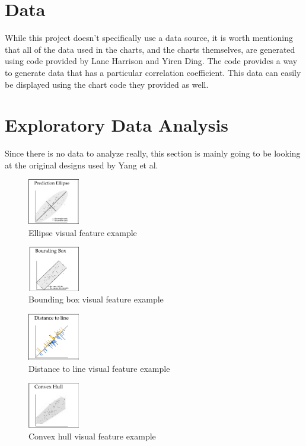 \documentclass{proc}
\begin{document}
	\section{Data} 
		While this project doesn't specifically use a data source, it is worth mentioning that all of the data used in the charts, and the charts themselves, are generated using code provided by Lane Harrison and Yiren Ding. The code provides a way to generate data that has a particular correlation coefficient. This data can easily be displayed using the chart code they provided as well.
	\section{Exploratory Data Analysis}
		Since there is no data to analyze really, this section is mainly going to be looking at the original designs used by Yang et al. 
		\begin{figure}[t]
			\centering
			\includegraphics[width=0.2\textwidth]{ellipse}
			\caption{Ellipse visual feature example \cite{Yang2019}}
			\label{fig:ellipse}
		\end{figure}
		\begin{figure}[t]
			\centering
			\includegraphics[width=0.2\textwidth]{bounding}
			\caption{Bounding box visual feature example \cite{Yang2019}}
			\label{fig:bounding}
		\end{figure}
		\begin{figure}[t]
			\centering
			\includegraphics[width=0.2\textwidth]{distance}
			\caption{Distance to line visual feature example \cite{Yang2019}}
			\label{fig:distance}
		\end{figure}
		\begin{figure}[t]
			\centering
			\includegraphics[width=0.2\textwidth]{convex}
			\caption{Convex hull visual feature example \cite{Yang2019}}
			\label{fig:convex}
		\end{figure}
\end{document}
